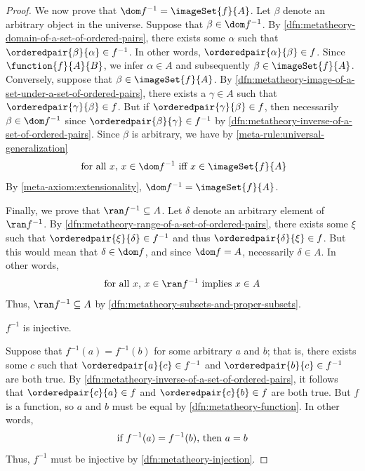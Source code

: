 \begin{proof}
    \vspace{0.3cm}
    \noindent
    We now prove that \( \dom f^{-1} = \imageSet{f}{A} \).
    Let \( \beta \) denote an arbitrary object in the universe.
    Suppose that \( \beta \in \dom f^{-1} \).
    By \cref{dfn:metatheory-domain-of-a-set-of-ordered-pairs}, there exists some \( \alpha \) such that \( \orderedpair{\beta}{\alpha} \in f^{-1} \).
    In other words, \( \orderedpair{\alpha}{\beta} \in f \). Since \( \function{f}{A}{B} \), we infer \( \alpha \in A \) and subsequently
    \( \beta \in \imageSet{f}{A} \).
    Conversely, suppose that \( \beta \in \imageSet{f}{A} \).
    By \cref{dfn:metatheory-image-of-a-set-under-a-set-of-ordered-pairs}, there exists a \( \gamma \in A \) such that \( \orderedpair{\gamma}{\beta} \in f \).
    But if \( \orderedpair{\gamma}{\beta} \in f \), then necessarily \( \beta \in \dom f^{-1} \) since
    \( \orderedpair{\beta}{\gamma} \in f^{-1} \) by \cref{dfn:metatheory-inverse-of-a-set-of-ordered-pairs}.
    Since \( \beta \) is arbitrary, we have by \cref{meta-rule:universal-generalization}
    \begin{equation*}
        \text{ for all \( x \),  \( x \in \dom f^{-1} \) iff \( x \in \imageSet{f}{A} \)}
    \end{equation*}
    By \cref{meta-axiom:extensionality}, \( \dom f^{-1} = \imageSet{f}{A} \).
    
    \vspace{0.3cm}
    \noindent
    Finally, we prove that \( \ran f^{-1} \subseteq A \).
    Let \( \delta \) denote an arbitrary element of \( \ran f^{-1} \).
    By \cref{dfn:metatheory-range-of-a-set-of-ordered-pairs}, there exists some \( \xi \) such that \( \orderedpair{\xi}{\delta} \in f^{-1} \)
    and thus \( \orderedpair{\delta}{\xi} \in f \).
    But this would mean that \( \delta \in \dom f \), and since \( \dom f = A \), necessarily \( \delta \in A \).
    In other words,
    \begin{equation*}
        \text{for all \( x \), \( x \in \ran f^{-1} \) implies \( x \in A \)}
    \end{equation*}
    Thus, \( \ran f^{-1} \subseteq A \) by \cref{dfn:metatheory-subsets-and-proper-subsets}.

    \begin{claim}
         \label{claim:f-inverse-is-injective}
        \( f^{-1} \) is injective.
    \end{claim}
    \noindent
    Suppose that \( f^{-1}(a) = f^{-1}(b) \) for some arbitrary \( a \) and \( b \);
    that is, there exists some \( c \) such that \( \orderedpair{a}{c} \in f^{-1} \) and \( \orderedpair{b}{c} \in f^{-1} \)
    are both true.
    By \cref{dfn:metatheory-inverse-of-a-set-of-ordered-pairs}, it follows that \( \orderedpair{c}{a} \in f \) and \( \orderedpair{c}{b} \in f \)
    are both true.
    But \( f \) is a function, so \( a \) and \( b \) must be equal by \cref{dfn:metatheory-function}.
    In other words,
    \begin{equation*}
        \text{if \( f^{-1}(a) = f^{-1}(b) \), then \( a = b \)}
    \end{equation*}
    Thus, \( f^{-1} \) must be injective by \cref{dfn:metatheory-injection}.


\end{proof}
